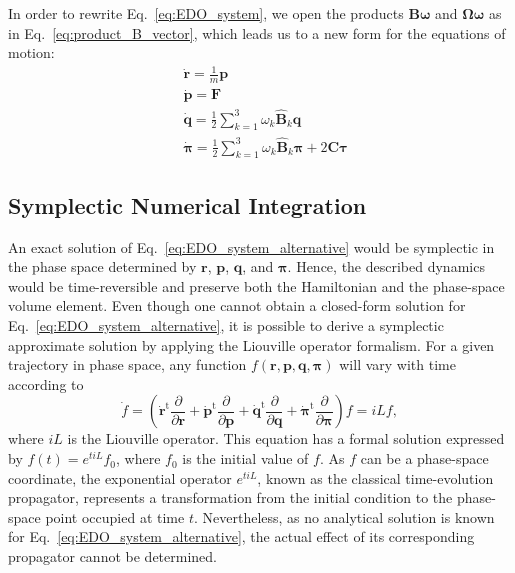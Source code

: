 \documentclass[aip,jcp,reprint,amsmath,amssymb]{revtex4-1}
\newcommand{\mt}[1]{\boldsymbol{\mathbf{#1}}}           %
\newcommand{\vt}[1]{\boldsymbol{\mathbf{#1}}}           %
\newcommand{\tr}[1]{#1^\text{t}}                        %
\newcommand{\diff}[2]{\dfrac{\partial #1}{\partial #2}} %
\begin{document}
In order to rewrite Eq.~\ref{eq:EDO_system}, we open the products $\mt B \vt \omega$ and $\mt \Omega \vt \omega$ as in Eq.~\ref{eq:product_B_vector}, which leads us to a new form for the equations of motion:
\begin{subequations}
\label{eq:EDO_system_alternative}
\begin{align}
&\dot{\vt r} = \frac{1}{m} \vt p \\
&\dot{\vt p} = \vt F \\
&\dot{\vt q} = \frac{1}{2} \sum_{k=1}^3 \omega_k \hat{\mt B}_k \vt q \label{eq:edo_q} \\
&\dot{\vt \pi} = \frac{1}{2} \sum_{k=1}^3 \omega_k \hat{\mt B}_k \vt \pi + 2 \mt C \vt \tau \label{eq:edo_pi}
\end{align}
\end{subequations}

\subsection{Symplectic Numerical Integration}  
\label{sec:symplectic}

An exact solution of Eq.~\ref{eq:EDO_system_alternative} would be symplectic in the phase space determined by $\vt r$, $\vt p$, $\vt q$, and $\vt \pi$. Hence, the described dynamics would be time-reversible and preserve both the Hamiltonian and the phase-space volume element. Even though one cannot obtain a closed-form solution for Eq.~\ref{eq:EDO_system_alternative}, it is possible to derive a symplectic approximate solution by applying the Liouville operator formalism.\cite{Tuckerman2010} For a given trajectory in phase space, any function $f(\vt r, \vt p, \vt q, \vt \pi)$ will vary with time according to
\[
\dot{f} = \left( \tr{\dot{\vt r}} \diff{}{\vt r} + \tr{\dot{\vt p}} \diff{}{\vt p} + \tr{\dot{\vt q}} \diff{}{\vt q} + \tr{\dot{\vt \pi}} \diff{}{\vt \pi} \right) f = i\!L f,
\]
where $i\!L$ is the Liouville operator. This equation has a formal solution expressed by $f(t) = e^{t i\!L}f_0$, where $f_0$ is the initial value of $f$. As $f$ can be a phase-space coordinate, the exponential operator $e^{t i\!L}$, known as the classical time-evolution propagator,\cite{Tuckerman2008} represents a transformation from the initial condition to the phase-space point occupied at time $t$. Nevertheless, as no analytical solution is known for Eq.~\ref{eq:EDO_system_alternative}, the actual effect of its corresponding propagator cannot be determined.
\end{document}
